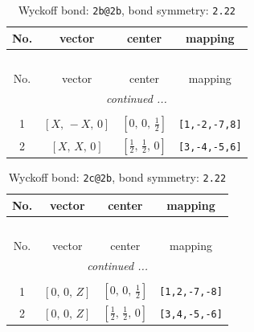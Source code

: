 \documentclass[fleqn,8pt]{jsarticle}
\begin{document}
\renewcommand{\arraystretch}{1.2}
\begin{longtable}{cccc}
\caption{Wyckoff bond: {\tt 2b@2b}, bond symmetry: {\tt 2.22}}
 \\
 \hline \hline
No. & vector & center & mapping \\ \hline \endfirsthead

\multicolumn{3}{l}{\tablename\ \thetable{}} \\
 \hline \hline
No. & vector & center & mapping \\ \hline \endhead

 \hline \hline
\multicolumn{3}{r}{\footnotesize\it continued ...} \\ \endfoot

 \hline \hline
\multicolumn{3}{r}{} \\ \endlastfoot

1 & $\left[ X,\, - X,\, 0 \right]$ & $\left[ 0,\, 0,\, \frac{1}{2} \right]$ & {\tt [1,-2,-7,8]} \\ \hline
2 & $\left[ X,\, X,\, 0 \right]$ & $\left[ \frac{1}{2},\, \frac{1}{2},\, 0 \right]$ & {\tt [3,-4,-5,6]} \\
\end{longtable}
\renewcommand{\arraystretch}{1.2}
\begin{longtable}{cccc}
\caption{Wyckoff bond: {\tt 2c@2b}, bond symmetry: {\tt 2.22}}
 \\
 \hline \hline
No. & vector & center & mapping \\ \hline \endfirsthead

\multicolumn{3}{l}{\tablename\ \thetable{}} \\
 \hline \hline
No. & vector & center & mapping \\ \hline \endhead

 \hline \hline
\multicolumn{3}{r}{\footnotesize\it continued ...} \\ \endfoot

 \hline \hline
\multicolumn{3}{r}{} \\ \endlastfoot

1 & $\left[ 0,\, 0,\, Z \right]$ & $\left[ 0,\, 0,\, \frac{1}{2} \right]$ & {\tt [1,2,-7,-8]} \\ \hline
2 & $\left[ 0,\, 0,\, Z \right]$ & $\left[ \frac{1}{2},\, \frac{1}{2},\, 0 \right]$ & {\tt [3,4,-5,-6]} \\
\end{longtable}
\renewcommand{\arraystretch}{1.2}
\end{document}
